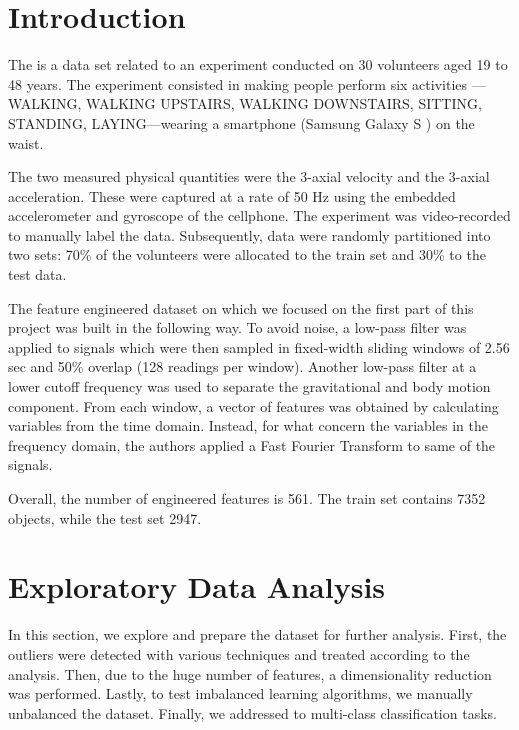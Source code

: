 \documentclass[10pt, a4paper, twocolumn]{article}
\begin{document}
	

\restoregeometry

\tableofcontents
\thispagestyle{empty}

\section*{Introduction}%

The  \parencite{har:2012} is a data set related to an experiment conducted on 30 volunteers aged 19 to 48 years. The experiment consisted in making people perform six activities ---WALKING, WALKING UPSTAIRS, WALKING DOWNSTAIRS, SITTING, STANDING, LAYING---wearing a smartphone (Samsung Galaxy S ) on the waist.

The two measured physical quantities were the 3-axial velocity and the 3-axial acceleration. These were captured at a rate of 50 Hz using the embedded accelerometer and gyroscope of the cellphone. The experiment was video-recorded to manually label the data. Subsequently, data were randomly partitioned into two sets: 70\% of the volunteers were allocated to the train set and 30\% to the test data. 

The feature engineered dataset on which we focused on the first part of this project was built in the following way. To avoid noise, a low-pass filter was applied to signals which were then sampled in fixed-width sliding windows of 2.56 sec and 50\% overlap (128 readings per window). Another low-pass filter at a lower cutoff frequency was used to separate the gravitational and body motion component. From each window, a vector of features was obtained by calculating variables from the time domain. Instead, for what concern the variables in the frequency domain, the authors applied a Fast Fourier Transform to same of the signals.

Overall, the number of engineered features is 561. The train set contains 7352 objects, while the test set 2947.

\section{Exploratory Data Analysis}

In this section, we explore and prepare the dataset for further analysis. First, the outliers were detected with various techniques and treated according to the analysis. Then, due to the huge number of features, a dimensionality reduction was performed. Lastly, to test imbalanced learning algorithms, we manually unbalanced the dataset. Finally, we addressed to multi-class classification tasks.
\end{document}

